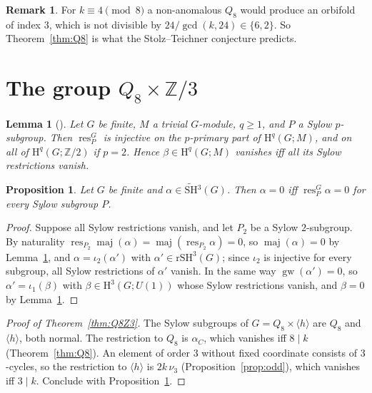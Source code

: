 \documentclass[11pt]{amsart}
\newtheorem{lemma}[theorem]{Lemma}
\newtheorem{proposition}[theorem]{Proposition}
\theoremstyle{definition}
\newtheorem{remark}[theorem]{Remark}
\newcommand{\Z}{\mathbb{Z}}
\newcommand{\res}{\operatorname{res}}
\newcommand{\maj}{\operatorname{maj}}
\newcommand{\gw}{\operatorname{gw}}
\newcommand{\SH}{\widetilde{\mathrm{SH}}{}^3}
\newcommand{\rSH}{\mathrm{rSH}^3}
\newcommand{\Hc}{\mathrm{H}}
\begin{document}
\begin{remark}
For $k\equiv4\pmod8$ a non-anomalous $Q_8$ would produce an orbifold of index $3$, which is not divisible
by $24/\gcd(k,24)\in\{6,2\}$. So Theorem~\ref{thm:Q8} is what the Stolz--Teichner conjecture predicts.
\end{remark}

\section{The group \texorpdfstring{$Q_8\times\Z/3$}{Q8 x Z/3}}\label{sec:Q8Z3}

\begin{lemma}[{\cite[III.9--III.10]{Brown}}]\label{lem:sylow}
Let $G$ be finite, $M$ a trivial $G$-module, $q\ge1$, and $P$ a Sylow $p$-subgroup. Then $\res^G_P$ is
injective on the $p$-primary part of $\Hc^q(G;M)$, and on all of $\Hc^q(G;\Z/2)$ if $p=2$. Hence
$\beta\in\Hc^q(G;M)$ vanishes iff all its Sylow restrictions vanish.
\end{lemma}

\begin{proposition}\label{prop:sylow}
Let $G$ be finite and $\alpha\in\SH(G)$. Then $\alpha=0$ iff $\res^G_P\alpha=0$ for every Sylow subgroup
$P$.
\end{proposition}

\begin{proof}
Suppose all Sylow restrictions vanish, and let $P_2$ be a Sylow $2$-subgroup. By naturality
$\res_{P_2}\maj(\alpha)=\maj(\res_{P_2}\alpha)=0$, so $\maj(\alpha)=0$ by Lemma~\ref{lem:sylow}, and
$\alpha=\iota_2(\alpha')$ with $\alpha'\in\rSH(G)$; since $\iota_2$ is injective for every subgroup, all
Sylow restrictions of $\alpha'$ vanish. In the same way $\gw(\alpha')=0$, so $\alpha'=\iota_1(\beta)$ with
$\beta\in\Hc^3(G;U(1))$ whose Sylow restrictions vanish, and $\beta=0$ by Lemma~\ref{lem:sylow}.
\end{proof}

\begin{proof}[Proof of Theorem~\ref{thm:Q8Z3}]
The Sylow subgroups of $G=Q_8\times\langle h\rangle$ are $Q_8$ and $\langle h\rangle$, both normal. The
restriction to $Q_8$ is $\alpha_C$, which vanishes iff $8\mid k$ (Theorem~\ref{thm:Q8}). An element of
order $3$ without fixed coordinate consists of $3$-cycles, so the restriction to $\langle h\rangle$ is
$2k\,\nu_3$ (Proposition~\ref{prop:odd}), which vanishes iff $3\mid k$. Conclude with
Proposition~\ref{prop:sylow}.
\end{proof}
\end{document}
